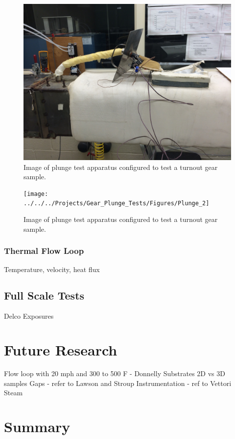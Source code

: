 \documentclass[12pt,oneside]{book}
\begin{document}
\begin{figure}[ht!]
\includegraphics[width=\columnwidth]{../../../Projects/Gear_Plunge_Tests/Pictures/Plunge_2}
\caption{Image of plunge test apparatus configured to test a turnout gear sample.}
\label{fig:plunge_pic}
\end{figure}

\begin{figure}[ht!]
\texttt{[image: ../../../Projects/Gear\_Plunge\_Tests/Figures/Plunge\_2]}
\caption{Image of plunge test apparatus configured to test a turnout gear sample.}
\label{fig:plunge_pic}
\end{figure}


\subsection{Thermal Flow Loop}
		Temperature, velocity, heat flux

\section{Full Scale Tests}
	Delco Exposures


\chapter{Future Research}
Flow loop  with 20 mph and 300 to 500 F - Donnelly
Substrates
2D vs 3D samples
Gaps - refer to Lawson and Stroup
Instrumentation - ref to Vettori
Steam

\chapter{Summary}
\end{document}
